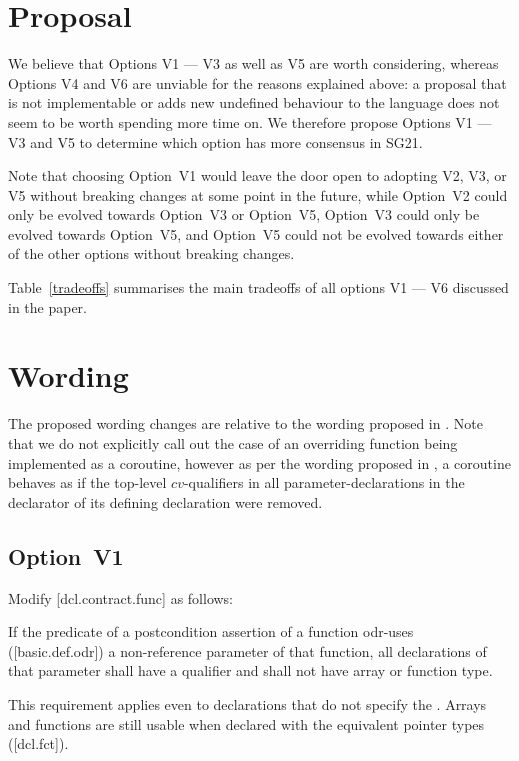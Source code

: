
\section{Proposal}

We believe that Options V1 --- V3 as well as V5 are worth considering, whereas Options V4 and V6 are unviable for the reasons explained above: a proposal that is not implementable or adds new undefined behaviour to the language does not seem to be worth spending more time on. We therefore propose Options V1 --- V3 and V5 to determine which option has more consensus in SG21. 

Note that choosing Option~V1 would leave the door open to adopting V2, V3, or V5 without breaking changes at some point in the future, while Option~V2 could only be evolved towards Option~V3 or Option~V5, Option~V3 could only be evolved towards Option~V5, and Option~V5 could not be evolved towards either of the other options without breaking changes.

Table~\ref{tradeoffs} summarises the main tradeoffs of all options V1 --- V6 discussed in the paper.

\section{Wording}

The proposed wording changes are relative to the wording proposed in \cite{P2900R10}. Note that we do not explicitly call out the case of an overriding function being implemented as a coroutine, however as per the wording proposed in \cite{P2900R10}, a coroutine behaves as if the top-level $cv$-qualifiers in all parameter-declarations in the declarator of its defining declaration were removed.

\subsection*{Option~V1}

Modify [dcl.contract.func] as follows:

\begin{adjustwidth}{0.5cm}{0.5cm}
If the predicate of a postcondition assertion of a function odr-uses ([basic.def.odr]) a
non-reference parameter of that function, all declarations of that parameter shall have a  qualifier and shall not have array or function type.
\begin{note}
This requirement applies even to declarations
that do not specify the . Arrays and functions are still usable when declared with the equivalent pointer types ([dcl.fct]).
\end{note}
\begin{example}
\tcode{[...]}
\end{example}
\end{adjustwidth}

